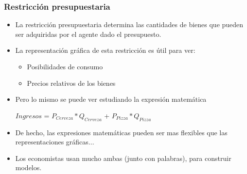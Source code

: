\documentclass{beamer}
\begin{document}
\begin{frame}
\frametitle{Restricción presupuestaria}
\begin{itemize}
    \item La restricción presupuestaria determina las cantidades de bienes que pueden ser adquiridas por el agente dado el presupuesto.
    \item La representación gráfica de esta restricción es útil para ver:
    \begin{itemize}
        \item Posibilidades de consumo
        \item Precios relativos de los bienes
    \end{itemize}
    \item Pero lo mismo se puede ver estudiando la expresión matemática \\ \vspace{2mm}
    \begin{center}
    $Ingresos$ = $P_{Cerveza} * Q_{Cerveza}$ + $P_{Pizza} * Q_{Pizza}$
    \\
    \end{center}\vspace{2mm}
    \item De hecho, las expresiones matemáticas pueden ser mas flexibles que las representaciones gráficas...
    \item Los economistas usan mucho ambas (junto con palabras), para construir modelos.
\end{itemize} 
\end{frame}
\end{document}
